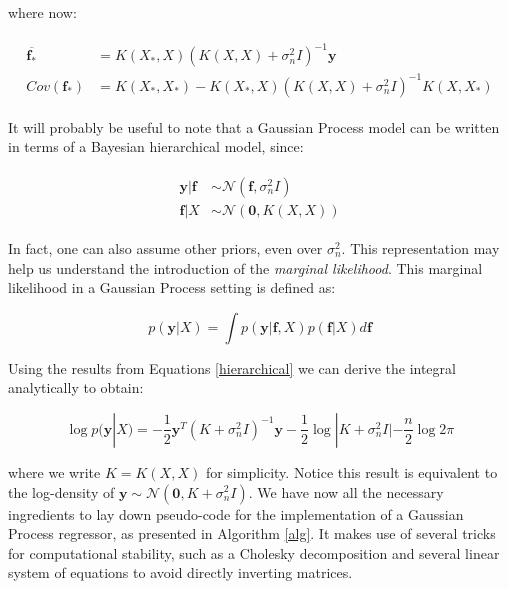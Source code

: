 \documentclass[10pt,a4paper,twoside]{book}
\begin{document}
where now:

\begin{align}
\begin{split}
\boldsymbol{\overline{f_*}} &= K(X_*, X)\left(K(X, X) + \sigma^2_n I   \right)^{-1}\boldsymbol{y}\\
Cov(\boldsymbol{f_*}) &= K(X_*, X_*) - K(X_*, X)\left(K(X, X) + \sigma_n^2 I \right)^{-1}K(X, X_*)
\end{split}
\end{align}

It will probably be useful to note that a Gaussian Process model can be written in terms of a Bayesian hierarchical model, since:

\begin{align}
\begin{split}
\label{hierarchical}
\boldsymbol{y}|\boldsymbol{f} &\sim \mathcal{N}(\boldsymbol{f}, \sigma^2_n I)\\
\boldsymbol{f}|X &\sim \mathcal{N}(\boldsymbol{0}, K(X, X))
\end{split}
\end{align}

In fact, one can also assume other priors, even over $\sigma_n^2$. This representation may help us understand the introduction of the \textit{marginal likelihood}. This marginal likelihood in a Gaussian Process setting is defined as:

\begin{equation}\label{marglike}
p(\boldsymbol{y}|X) = \int p(\boldsymbol{y}|\boldsymbol{f}, X)p(\boldsymbol{f}|X) d\boldsymbol{f}
\end{equation}

Using the results from Equations \ref{hierarchical} we can derive the integral analytically to obtain:

\begin{equation}
\log p(\boldsymbol{y}|X) = - \dfrac{1}{2}\boldsymbol{y}^T(K + \sigma^2_n I)^{-1}\boldsymbol{y} - \dfrac{1}{2}\log |K + \sigma^2_n I| - \dfrac{n}{2}\log 2\pi
\end{equation}

where we write $K=K(X, X)$ for simplicity. Notice this result is equivalent to the log-density of $\boldsymbol{y} \sim \mathcal{N}(\boldsymbol{0}, K + \sigma_n^2 I)$. We have now all the necessary ingredients to lay down pseudo-code for the implementation of a Gaussian Process regressor, as presented in Algorithm \ref{alg}. It makes use of several tricks for computational stability, such as a Cholesky decomposition and several linear system of equations to avoid directly inverting matrices.\\
\end{document}
